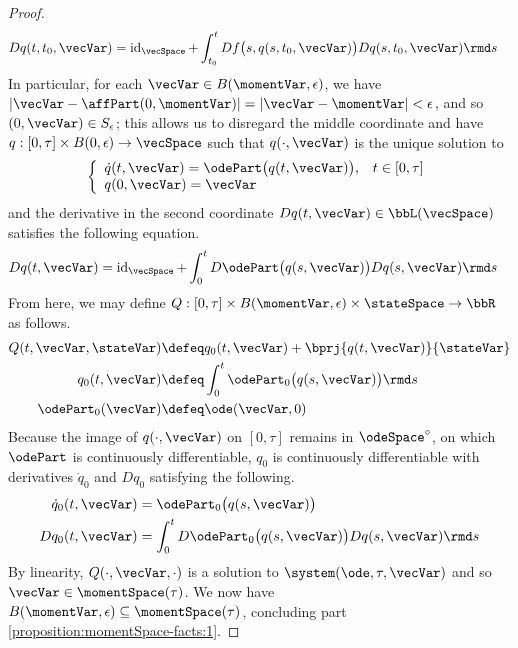 \begin{proof}
\begin{align}
    D q(t,t_0,\vecVar) 
    &= \operatorname{id}_\vecSpace + \int_{t_0}^t Df\big(s, q(s,t_0,\vecVar) \big) Dq(s, t_0, \vecVar) \rmd s
  \end{align}
  In particular, for each $\vecVar \in B(\momentVar, \epsilon)$, we have $|\vecVar - \affPart(0,\momentVar)| = |\vecVar - \momentVar| < \epsilon$, and so $(0,\vecVar) \in S_\epsilon$; this allows us to disregard the middle coordinate and have $q: [0,\tau] \times B(0,\epsilon) \rightarrow \vecSpace$ such that $q(\cdot,\vecVar)$ is the unique solution to 
  \begin{equation}
    \label{eq:chart-system}
    \left\{\begin{array}{ll}
      \dot q(t, \vecVar) = \odePart\big(q(t, \vecVar)\big), & t \in [0,\tau] \\
      q(0, \vecVar) = \vecVar
    \end{array}\right.
  \end{equation}
  and the derivative in the second coordinate $Dq(t,\vecVar) \in \bbL(\vecSpace)$ satisfies the following equation.
  \begin{align}
    D q(t,\vecVar) &= \operatorname{id}_\vecSpace + \int_0^t D\odePart\big(q(s,\vecVar)\big)Dq(s, \vecVar) \rmd s
  \end{align}
  From here, we may define $Q: [0,\tau] \times B(\momentVar,\epsilon) \times \stateSpace \rightarrow \bbR$ as follows.
  \begin{align}
    Q(t,\vecVar,\stateVar) &\defeq q_0(t,\vecVar) + \bprj{q(t,\vecVar)}{\stateVar} \\
    q_0(t,\vecVar) &\defeq \int_0^t \odePart_0\big(q(s,\vecVar)\big) \rmd s \\
    \odePart_0(\vecVar) &\defeq \ode(\vecVar, 0)
  \end{align}
  Because the image of $q(\cdot, \vecVar)$ on $[0,\tau]$ remains in $\odeSpace^\circ$, on which $\odePart$ is continuously differentiable, $q_0$ is continuously differentiable with derivatives $\dot q_0$ and $D q_0$ satisfying the following.
  \begin{align}
    \dot q_0(t,\vecVar) &= \odePart_0\big(q(s,\vecVar)\big) \\
    D q_0(t, \vecVar) &= \int_0^t D\odePart_0\big( q(s, \vecVar) \big) Dq(s, \vecVar) \rmd s
  \end{align}
  By linearity, $Q(\cdot,\vecVar,\cdot)$ is a solution to $\system(\ode, \tau, \vecVar)$ and so $\vecVar \in \momentSpace(\tau)$.
  We now have $B(\momentVar,\epsilon) \subseteq \momentSpace(\tau)$, concluding part \ref{proposition:momentSpace-facts:1}.

\end{proof}

